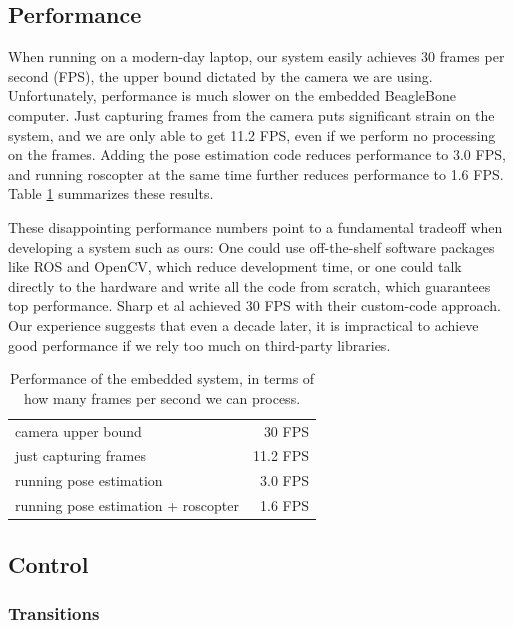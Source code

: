 \documentclass[10pt]{scrartcl} %
\begin{document}
\subsection{Performance}

When running on a modern-day laptop, our system easily achieves 30 frames per
second (FPS), the upper bound dictated by the camera we are using.
Unfortunately, performance is much slower on the embedded BeagleBone computer.
Just capturing frames from the camera puts significant strain on the system,
and we are only able to get 11.2 FPS, even if we perform no processing on the
frames. Adding the pose estimation code reduces performance to 3.0 FPS, and
running roscopter at the same time further reduces performance to 1.6 FPS.
Table \ref{tab:fps} summarizes these results.

These disappointing performance numbers point to a fundamental tradeoff when
developing a system such as ours: One could use off-the-shelf software packages
like ROS and OpenCV, which reduce development time, or one could talk directly
to the hardware and write all the code from scratch, which guarantees top
performance. Sharp et al \cite{sharp_et_al_2001} achieved 30 FPS with their
custom-code approach. Our experience suggests that even a decade later, it is
impractical to achieve good performance if we rely too much on third-party
libraries.

\begin{table}[h!]
    \centering
    \begin{tabular}{lr}
        camera upper bound                      &   30 FPS \\
        just capturing frames                   &   11.2 FPS \\
        running pose estimation                 &   3.0 FPS \\
        running pose estimation + roscopter     &   1.6 FPS \\
    \end{tabular}
    \caption{
        Performance of the embedded system, in terms of how many frames per
        second we can process.
    }
    \label{tab:fps}
\end{table}


\subsection{Control}


\subsubsection{Transitions}
\end{document}
